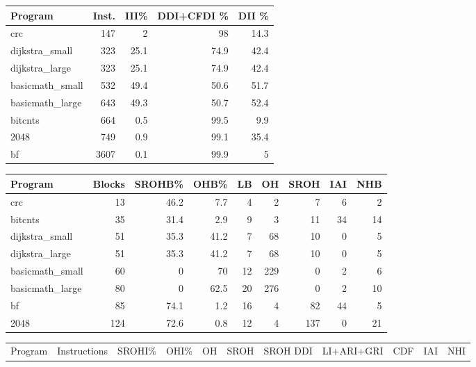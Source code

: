 \begin{tabular}{lrrrr}
\hline
 Program         &   Inst. &   III\% &   DDI+CFDI \% &   DII \% \\
\hline
 crc             &     147 &    2   &         98   &    14.3 \\
 dijkstra\_small  &     323 &   25.1 &         74.9 &    42.4 \\
 dijkstra\_large  &     323 &   25.1 &         74.9 &    42.4 \\
 basicmath\_small &     532 &   49.4 &         50.6 &    51.7 \\
 basicmath\_large &     643 &   49.3 &         50.7 &    52.4 \\
 bitcnts         &     664 &    0.5 &         99.5 &     9.9 \\
 2048            &     749 &    0.9 &         99.1 &    35.4 \\
 bf              &    3607 &    0.1 &         99.9 &     5   \\
\hline
\end{tabular}\begin{tabular}{lrrrrrrrr}
\hline
 Program         &   Blocks &   SROHB\% &   OHB\% &   LB &   OH &   SROH &   IAI &   NHB \\
\hline
 crc             &       13 &     46.2 &    7.7 &    4 &    2 &      7 &     6 &     2 \\
 bitcnts         &       35 &     31.4 &    2.9 &    9 &    3 &     11 &    34 &    14 \\
 dijkstra\_small  &       51 &     35.3 &   41.2 &    7 &   68 &     10 &     0 &     5 \\
 dijkstra\_large  &       51 &     35.3 &   41.2 &    7 &   68 &     10 &     0 &     5 \\
 basicmath\_small &       60 &      0   &   70   &   12 &  229 &      0 &     2 &     6 \\
 basicmath\_large &       80 &      0   &   62.5 &   20 &  276 &      0 &     2 &    10 \\
 bf              &       85 &     74.1 &    1.2 &   16 &    4 &     82 &    44 &     5 \\
 2048            &      124 &     72.6 &    0.8 &   12 &    4 &    137 &     0 &    21 \\
\hline
\end{tabular}\begin{tabular}{lrrrrrrrrrr}
\hline
 Program         &   Instructions &   SROHI\% &   OHI\% &   OH &   SROH &   SROH DDI &   LI+ARI+GRI &   CDF &   IAI &   NHI \\

\end{tabular}
